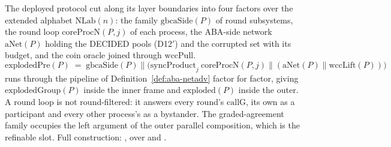 \begin{definition}
  \label{def:aba-exploded}
  \leanok
  The deployed protocol cut along its layer boundaries into four factors over the extended alphabet $\mathrm{NLab}(n)$: the family $\mathrm{gbcaSide}(P)$ of round subsystems, the round loop $\mathrm{coreProcN}(P,j)$ of each process, the ABA-side network $\mathrm{aNet}(P)$ holding the DECIDED pools (D12$'$) and the corrupted set with its budget, and the coin oracle joined through $\mathrm{wccPull}$.
  \[
    \mathrm{explodedPre}(P) \;=\;
      \mathrm{gbcaSide}(P) \parallel \bigl(\mathrm{syncProduct}_{j}\ \mathrm{coreProcN}(P,j)
        \parallel (\mathrm{aNet}(P) \parallel \mathrm{wccLift}(P))\bigr)
  \]
  runs through the pipeline of Definition~\ref{def:aba-netadv} factor for factor, giving $\mathrm{explodedGroup}(P)$ inside the inner frame and $\mathrm{exploded}(P)$ inside the outer.
  A round loop is not round-filtered: it answers every round's $\mathrm{callG}$, its own as a participant and every other process's as a bystander.
  The graded-agreement family occupies the left argument of the outer parallel composition, which is the refinable slot.
  Full construction: , over  and .
\end{definition}
